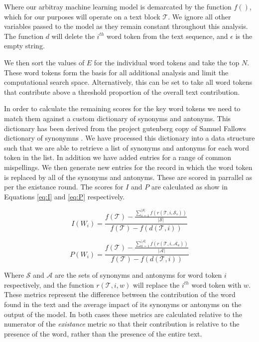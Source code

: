 \documentclass[12pt,a4paper]{article}
\numberwithin{equation}{section}
\begin{document}
Where our arbitray machine learning model is demarcated by the function $f()$, which for our purposes will operate on a text block $\mathscr{T}$.
We ignore all other variables passed to the model as they remain constant throughout this analysis. The function $d$ will delete the $i^{th}$ word
token from the text sequence, and $\epsilon$ is the empty string.

We then sort the values of $E$ for the individual word tokens and take the top $N$. These word tokens form the basis for all additional analysis
and limit the computational search space. Alternatively, this can be set to take all word tokens that contribute above a threshold proportion of the
overall text contribution.

In order to calculate the remaining scores for the key word tokens we need to match them against a custom dictionary of synonyms and antonyms. This
dictionary has been derived from the project gutenberg copy of Samuel Fallows dictionary of synonymns \cite{fallows}. We have processed this dictionary
into a data structure such that we are able to retrieve a list of synonyms and antonyms for each word token in the list. In addition we have added entries for a range of common mispellings. We then generate new entries for the record in which the word token is replaced by all of the synonyms and antonyms. These
are scored in parrallel as per the existance round. The scores for $I$ and $P$ are calculated as show in Equations \ref{eq:I} and \ref{eq:P} respectively.


\begin{equation}
\label{eq:I}
I(W_i) = \frac{ f(\mathscr{T}) - \frac{ \sum_{s=1}^{|\mathcal{S}|} f( r(\mathscr{T},i,\mathcal{S}_s) )}{|\mathcal{S}|} }{ f(\mathscr{T}) - f( d(\mathscr{T},i) ) }
\end{equation}
  
\begin{equation}
\label{eq:P}
P(W_i) = \frac{ f(\mathscr{T}) - \frac{ \sum_{a=1}^{|\mathcal{A}|} f( r(\mathscr{T},i,\mathcal{A}_a) )}{|\mathcal{A}|} }{ f(\mathscr{T}) - f( d(\mathscr{T},i) ) }
\end{equation}

Where $\mathcal{S}$ and $\mathcal{A}$ are the sets of synonyms and antonyms for word token $i$ respectively, and the function $r(\mathscr{T},i,w)$ will 
replace the $i^{th}$ word token with $w$. 
These metrics represent the difference between the contribution of the word found in the text and the average impact of its synonyms or antonyms
on the output of the model.  In both cases these metrics are calculated relative to the numerator of the \textit{existance} metric so that
their contribution is relative to the presence of the word, rather than the presence of the entire text.
\end{document}
